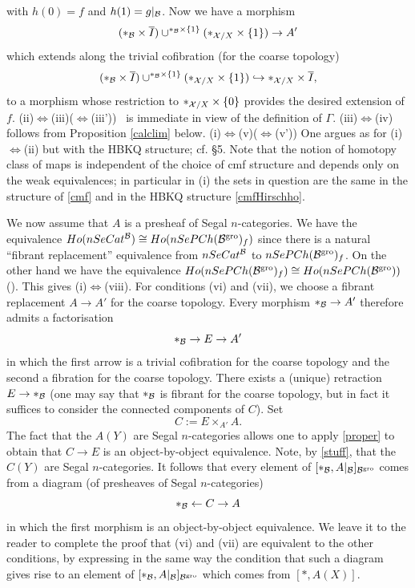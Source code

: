 with $h(0)= f$ and $h(1)= g|_{{\cal B}}$. Now we have a morphism
$$
(\ast _{{\cal B}} \times \overline{I})\cup^{\ast _{{\cal B}} \times \{ 1\}}
(\ast _{{\cal X} /X} \times \{ 1\}) \rightarrow A'
$$
which extends along the trivial cofibration (for the coarse topology)
$$
(\ast _{{\cal B}} \times \overline{I})\cup^{\ast _{{\cal B}} \times \{ 1\}}
(\ast _{{\cal X} /X} \times \{ 1\}) \hookrightarrow
\ast _{{\cal X} /X} \times \overline{I},
$$
to a morphism whose restriction to $\ast _{{\cal X} /X} \times \{ 0\}$ provides the
desired extension of $f$.
\newline
(ii)$\Leftrightarrow$(iii)($\Leftrightarrow$(iii')) \, is immediate in view of
the definition of $\Gamma$.
\newline
(iii)$\Leftrightarrow$(iv) \, follows from Proposition \ref{calclim} below.
\newline
(i)$\Leftrightarrow$(v)($\Leftrightarrow$(v')) One argues as for
(i)$\Leftrightarrow$(ii) but with the HBKQ structure; cf. \S 5. Note that the
notion of homotopy class of maps is independent of the choice of cmf
structure and depends only on the weak equivalences; in particular in (i) the
sets in question are the same in the structure of \ref{cmf} and in the HBKQ
structure \ref{cmfHirschho}.

We now assume that $A$ is a presheaf of Segal $n$-categories. We have the
equivalence $Ho(nSeCat^{{\cal B}})\cong Ho(nSePCh({\cal B} ^{\rm gro})_f)$ since there is
a natural ``fibrant replacement'' equivalence from $nSeCat^{{\cal B}}$ to
$nSePCh({\cal B} ^{\rm gro})_f$. On the other hand we have the equivalence
$Ho(nSePCh({\cal B} ^{\rm gro})_f) \cong Ho(nSePCh({\cal B} ^{\rm gro}))$
(\cite{Quillen}). This gives (i)$\Leftrightarrow$(viii).
For conditions (vi) and (vii), we choose a fibrant replacement $A\rightarrow
A'$ for the coarse topology. Every morphism $\ast _{{\cal B}}\rightarrow A'$
therefore admits a factorisation
$$
\ast _{{\cal B}}\rightarrow E \rightarrow A'
$$
in which the first arrow is a trivial cofibration for the coarse topology and
the second a fibration for the coarse topology. There exists a (unique)
retraction $E\rightarrow \ast _{{\cal B}}$ (one may say that $\ast _{{\cal B}}$ is
fibrant for the coarse topology, but in fact it suffices to consider the
connected components of $C$). Set
$$
C:= E\times _{A'} A.
$$
The fact that the $A(Y)$ are Segal $n$-categories allows one to apply
\ref{proper} to obtain that $C\rightarrow E$ is an object-by-object
equivalence. Note, by \ref{stuff}, that the $C(Y)$ are Segal $n$-categories.
It follows that every element of $[\ast _{{\cal B}}, A|_{{\cal B} }]_{{\cal B} ^{\rm gro}}$
comes from a diagram (of presheaves of Segal $n$-categories)
$$
\ast _{{\cal B}}\leftarrow C
\rightarrow A
$$
in which the first morphism is an object-by-object equivalence.
We leave it to the reader to complete the proof that (vi) and (vii) are
equivalent to the other conditions, by expressing in the same way the
condition that such a diagram gives rise to an element of $[\ast _{{\cal B}},
A|_{{\cal B} }]_{{\cal B} ^{\rm gro}}$ which comes from $[\ast , A(X)]$.
\eop


